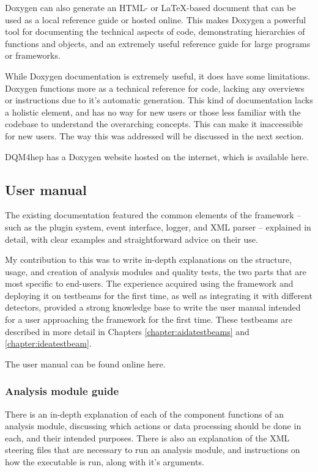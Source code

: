 Doxygen can also generate an HTML- or \LaTeX -based document that can be used as a local reference guide or hosted online. This makes Doxygen a powerful tool for documenting the technical aspects of code, demonstrating hierarchies of functions and objects, and an extremely useful reference guide for large programs or frameworks.

While Doxygen documentation is extremely useful, it does have some limitations. Doxygen functions more as a technical reference for code, lacking any overviews or instructions due to it's automatic generation. This kind of documentation lacks a holistic element, and has no way for new users or those less familiar with the codebase to understand the overarching concepts. This can make it inaccessible for new users. The way this was addressed will be discussed in the next section.

DQM4hep has a Doxygen website hosted on the internet, which is available here\cite{dqm4hep-doxygen}.

\subsection{User manual} %
The existing documentation featured the common elements of the framework -- such as the plugin system, event interface, logger, and XML parser -- explained in detail, with clear examples and straightforward advice on their use.

My contribution to this was to write in-depth explanations on the structure, usage, and creation of analysis modules and quality tests, the two parts that are most specific to end-users. The experience acquired using the framework and deploying it on testbeams for the first time, as well as integrating it with different detectors, provided a strong knowledge base to write the user manual intended for a user approaching the framework for the first time. These testbeams are described in more detail in Chapters \ref{chapter:aidatestbeams} and \ref{chapter:ideatestbeam}.

The user manual can be found online here\cite{dqm4hep-user-manual}.

\subsubsection*{Analysis module guide}
There is an in-depth explanation of each of the component functions of an analysis module, discussing which actions or data processing should be done in each, and their intended purposes. There is also an explanation of the \acrshort{XML} steering files that are necessary to run an analysis module, and instructions on how the executable is run, along with it's arguments.

